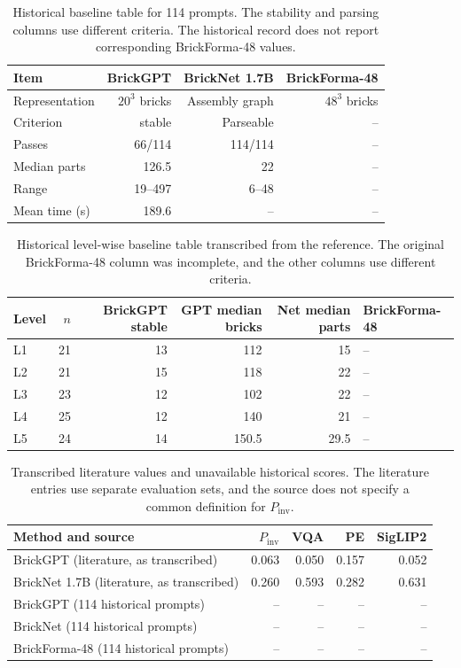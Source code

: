 \begin{table}[!htbp]\centering\small
\begin{tabular}{lrrr}\toprule
Item & BrickGPT & BrickNet 1.7B & BrickForma-48 \\ \midrule
Representation & $20^3$ bricks & Assembly graph & $48^3$ bricks \\
Criterion & stable & Parseable & -- \\
Passes & 66/114 & 114/114 & -- \\
Median parts & 126.5 & 22 & -- \\
Range & 19--497 & 6--48 & -- \\
Mean time (s) & 189.6 & -- & -- \\
\bottomrule\end{tabular}
\caption{Historical baseline table for 114 prompts. The stability and parsing columns use different criteria. The historical record does not report corresponding BrickForma-48 values.}
\end{table}

\begin{table}[!htbp]\centering\small
\begin{tabular}{lrrrrl}\toprule
Level & $n$ & BrickGPT stable & GPT median bricks & Net median parts & BrickForma-48 \\ \midrule
L1 & 21 & 13 & 112 & 15 & -- \\
L2 & 21 & 15 & 118 & 22 & -- \\
L3 & 23 & 12 & 102 & 22 & -- \\
L4 & 25 & 12 & 140 & 21 & -- \\
L5 & 24 & 14 & 150.5 & 29.5 & -- \\
\bottomrule\end{tabular}
\caption{Historical level-wise baseline table transcribed from the reference. The original BrickForma-48 column was incomplete, and the other columns use different criteria.}
\end{table}

\begin{table}[!htbp]\centering\small
\begin{tabular}{lrrrr}\toprule
Method and source & $P_{\mathrm{inv}}$ & VQA & PE & SigLIP2 \\ \midrule
BrickGPT (literature, as transcribed) & 0.063 & 0.050 & 0.157 & 0.052 \\
BrickNet 1.7B (literature, as transcribed) & 0.260 & 0.593 & 0.282 & 0.631 \\
BrickGPT (114 historical prompts) & -- & -- & -- & -- \\
BrickNet (114 historical prompts) & -- & -- & -- & -- \\
BrickForma-48 (114 historical prompts) & -- & -- & -- & -- \\
\bottomrule\end{tabular}
\caption{Transcribed literature values and unavailable historical scores. The literature entries use separate evaluation sets, and the source does not specify a common definition for $P_{\mathrm{inv}}$.}
\end{table}

